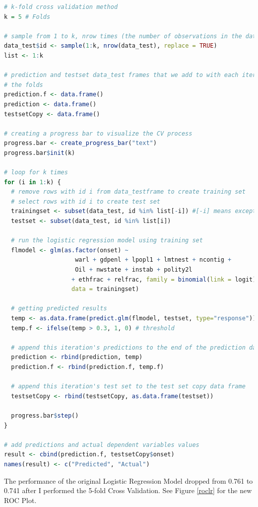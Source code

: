 \documentclass{article}
\begin{document}
\begin{lstlisting}[language=R, caption=Logistic Regression Model (Cross-Validated)]
# k-fold cross validation method
k = 5 # Folds

# sample from 1 to k, nrow times (the number of observations in the data_test)
data_test$id <- sample(1:k, nrow(data_test), replace = TRUE)
list <- 1:k

# prediction and testset data_test frames that we add to with each iteration over
# the folds
prediction.f <- data.frame()
prediction <- data.frame()
testsetCopy <- data.frame()

# creating a progress bar to visualize the CV process
progress.bar <- create_progress_bar("text")
progress.bar$init(k)

# loop for k times
for (i in 1:k) {
  # remove rows with id i from data_testframe to create training set
  # select rows with id i to create test set
  trainingset <- subset(data_test, id %in% list[-i]) #[-i] means except i
  testset <- subset(data_test, id %in% list[i])
 
  # run the logistic regression model using training set
  flmodel <- glm(as.factor(onset) ~ 
                    warl + gdpenl + lpopl1 + lmtnest + ncontig + 
                    Oil + nwstate + instab + polity2l
                   + ethfrac + relfrac, family = binomial(link = logit),
                   data = trainingset)
  
  # getting predicted results
  temp <- as.data.frame(predict.glm(flmodel, testset, type="response"))
  temp.f <- ifelse(temp > 0.3, 1, 0) # threshold
  
  # append this iteration's predictions to the end of the prediction data_test frame
  prediction <- rbind(prediction, temp)
  prediction.f <- rbind(prediction.f, temp.f)
  
  # append this iteration's test set to the test set copy data frame
  testsetCopy <- rbind(testsetCopy, as.data.frame(testset))
  
  progress.bar$step()
}

# add predictions and actual dependent variables values
result <- cbind(prediction.f, testsetCopy$onset)
names(result) <- c("Predicted", "Actual")
\end{lstlisting}

The performance of the original Logistic Regression Model dropped from 0.761 to 0.741 after I performed the 5-fold Cross Validation. See Figure \ref{roclr} for the new ROC Plot.
\end{document}
